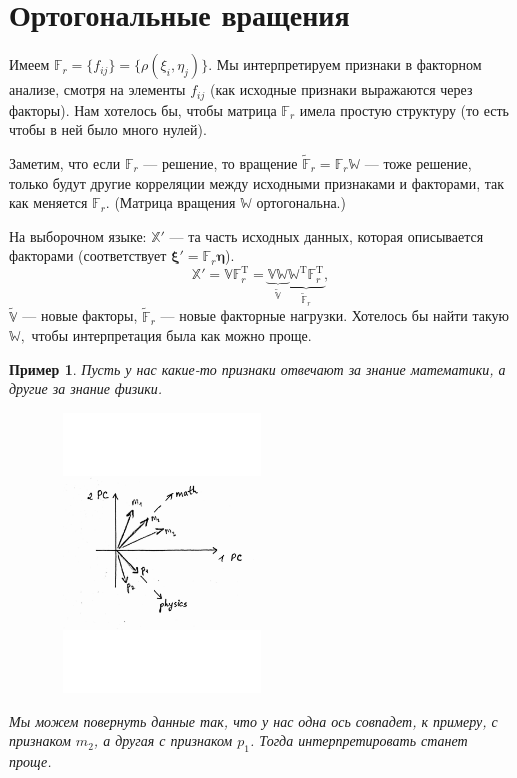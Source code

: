 \documentclass[specialist, 12pt,
subf, %
href, colorlinks=true,
substylefile = spbu.rtx,
]{disser}
\newtheorem{example}{Пример}
\begin{document}
\newpage
\section{Ортогональные вращения}

Имеем $\mathbb{F}_r=\{f_{ij}\}=\{\rho(\xi_i,\eta_j)\}$. Мы интерпретируем признаки в факторном анализе, смотря на элементы $f_{ij}$ (как исходные признаки выражаются через факторы). Нам хотелось бы, чтобы матрица $\mathbb{F}_r$ имела простую структуру (то есть чтобы в ней было много нулей).

Заметим, что если $\mathbb{F}_r$ --- решение, то вращение $\widetilde{\mathbb{F}}_r=\mathbb{F}_r\mathbb{W}$ --- тоже решение, только будут другие корреляции между исходными признаками и факторами, так как меняется $\mathbb{F}_r$. (Матрица вращения $\mathbb{W}$ ортогональна.)

На выборочном языке: $\mathbb{X}'$ --- та часть исходных данных, которая описывается факторами (соответствует $\bm\xi'=\mathbb{F}_r\bm\eta$).
\begin{equation*}
\mathbb{X}'=\mathbb{V}\mathbb{F}^\mathrm{T}_r=\underbrace{\mathbb{V}\mathbb{W}}_{\widetilde{\mathbb{V}}}\underbrace{\mathbb{W}^\mathrm{T}\mathbb{F}^\mathrm{T}_r}_{\widetilde{\mathbb{F}}_r},
\end{equation*}
$\widetilde{\mathbb{V}}$ --- новые факторы, $\widetilde{\mathbb{F}}_r$ --- новые факторные нагрузки. Хотелось бы найти такую $\mathbb{W},$ чтобы интерпретация была как можно проще.

\begin{example}
	Пусть у нас какие-то признаки отвечают за знание математики, а другие за знание физики.
	\begin{center}
	\begin{minipage}{0.7\linewidth}
		\centering
\vspace{-0.5in}
		\includegraphics[width=230pt, height=210pt]{p12}
\vspace{-0.7in}
	\end{minipage}
\end{center}

Мы можем повернуть данные так, что у нас одна ось совпадет, к примеру, с признаком $m_2$, а другая с признаком $p_1$. Тогда интерпретировать станет проще.
\end{example}
\end{document}
